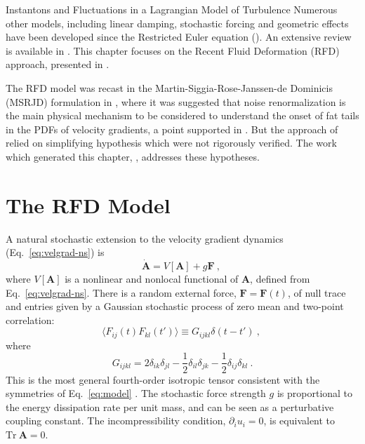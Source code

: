 \begin{chapter}{Instantons and Fluctuations in a Lagrangian Model of Turbulence}
Numerous other models, including linear damping, stochastic forcing and geometric effects have been developed since the Restricted Euler equation (\textcite{Martin98,girimaji90material,Chertkov99,Jeong2003}). An extensive review is available in \textcite{meneveau2011lagrangian}. This chapter focuses on the Recent Fluid Deformation (RFD) approach, presented in \textcite{ChevPRL}.

The RFD model was recast in the Martin-Siggia-Rose-Janssen-de Dominicis (MSRJD) formulation in \textcite{moriconi2014}, where it was suggested that noise renormalization is the main physical mechanism to be considered to understand the onset of fat tails in the PDFs of velocity gradients, a point supported in \textcite{grigorio2017instantons}. But the approach of \textcite{moriconi2014} relied on simplifying hypothesis which were not rigorously verified. The work which generated this chapter, \textcite{apolinario2019instantons}, addresses these hypotheses.

\section{The RFD Model} \label{sec:model}

A natural stochastic extension to the velocity gradient dynamics (Eq.~\ref{eq:velgrad-ns}) is
\begin{equation}  \label{eq:model}
 \dot{{\mathbf{A}}} = V[{\mathbf{A}}] + g \mathbf{F} \ , \ 
\end{equation} 
where $V[{\mathbf{A}}]$ is a nonlinear and nonlocal functional of  ${\mathbf{A}}$, defined from Eq.~\eqref{eq:velgrad-ns}.
There is a random external force, $\mathbf{F} = \mathbf{F}(t)$, of null trace and entries given by a Gaussian stochastic process of zero mean and two-point correlation:
\begin{equation}
 \langle F_{ij} (t) F_{kl} (t') \rangle \equiv G_{ijkl} \delta (t-t') \ , \ 
\end{equation}
where
\begin{equation} \label{eq:tensor-g}
 G_{ijkl} = 2 \delta_{ik} \delta_{jl} - \frac12 \delta_{il} \delta_{jk} - \frac12 \delta_{ij} \delta_{kl} \ .
\end{equation}
This is the most general fourth-order isotropic tensor consistent with the symmetries of Eq.~\eqref{eq:model} \parencite{pope2000}.
The stochastic force strength $g$ is proportional to the energy dissipation rate per unit mass, and can be seen as a perturbative coupling constant.
The incompressibility condition, $\partial_i u_i = 0$, is equivalent to
$\mathrm{Tr} \ \mathbf{A} = 0$.


\end{chapter}
